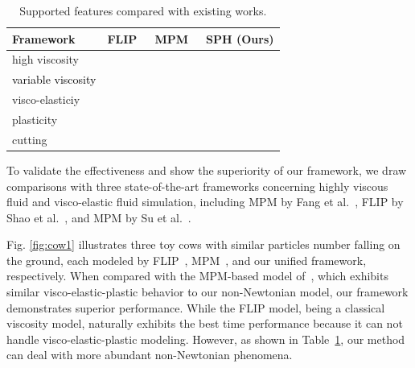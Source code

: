 \documentclass[10pt,journal,compsoc]{IEEEtran}
\newcommand{\revised}[1]{{\textcolor{black}{#1}}}
\begin{document}
\begin{table}[htbp]
	\centering
	\caption{Supported features compared with existing works.}\label{tab:feature1}
	\begin{tabular}{llll}
		\toprule
		Framework                    & FLIP~\cite{Shao-Huang2022-unsmoothed} & MPM~\cite{Fang2019-sillyRubber} & SPH (Ours)   \\
		\midrule
		high viscosity               & {\Checkmark}                          & {\Checkmark}                    & {\Checkmark} \\
		\revised{variable viscosity} & {\XSolidBrush}                        & {\XSolidBrush}                  & {\Checkmark} \\
		visco-elasticiy              & {\XSolidBrush}                        & {\Checkmark}                    & {\Checkmark} \\
		plasticity                   & {\XSolidBrush}                        & {\Checkmark}                    & {\Checkmark} \\
		cutting                      & {\XSolidBrush}                        & {\XSolidBrush}                  & {\Checkmark} \\
		\bottomrule
	\end{tabular}
\end{table}

To validate the effectiveness and show the superiority of our framework, we draw comparisons with three state-of-the-art frameworks concerning highly viscous fluid and visco-elastic fluid simulation, including MPM by Fang et al.~\cite{Fang2019-sillyRubber}, FLIP by Shao et al.~\cite{Shao-Huang2022-unsmoothed}, and MPM by Su et al.~\cite{Su2021}.

Fig. \ref{fig:cow1} illustrates three toy cows with similar particles number falling on the ground, each modeled by FLIP~\cite{Shao-Huang2022-unsmoothed}, MPM~\cite{Fang2019-sillyRubber}, and our unified framework, respectively. %
When compared with the MPM-based model of~\cite{Fang2019-sillyRubber}, which exhibits similar  visco-elastic-plastic behavior to our non-Newtonian model, our framework demonstrates superior performance.
While the FLIP model, being a classical viscosity model, naturally exhibits the best time performance because it can not handle visco-elastic-plastic modeling. However, as shown in Table~\ref{tab:feature1}, our method can deal with more abundant non-Newtonian phenomena.
\end{document}

